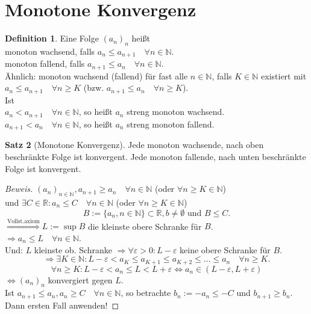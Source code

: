 \documentclass[12pt,a4paper,titlepage]{article} %
\theoremstyle{definition}
\newtheorem{satz}{Satz}[subsection]
\newtheorem{defi}[satz]{Definition}
\theoremstyle{remark}
\newenvironment{bew}{\begin{proof}[Beweis]}{\end{proof}}
\newcommand{\N}{\mathbb{N}}
\newcommand{\R}{\mathbb{R}}
\begin{document}
\section{Monotone Konvergenz}
\begin{defi}
	Eine Folge \((a_n)_n\) heißt \\monoton wachsend, falls \(a_n\leq a_{n+1} \quad \forall n\in\N \).\\monoton fallend, falls \(a_{n+1} \leq a_n \quad\forall n\in\N \).\\
	Ähnlich: monoton wachsend (fallend) für fast alle \(n\in\N\), falls \( K\in\N \) existiert mit \( a_n\leq a_{n+1} \quad \forall n\geq K \) (bzw. \(a_{n+1}\leq a_n \quad \forall n\geq K \)).\\
	Ist \\\( a_n<a_{n+1} \quad \forall n\in\N \), so heißt \(a_n\) streng monoton wachsend.\\
	\( a_{n+1}<a_n \quad \forall n\in\N \), so heißt \(a_n\) streng monoton fallend.
\end{defi}
\begin{satz}[Monotone Konvergenz]
	Jede monoton wachsende, nach oben beschränkte Folge ist konvergent. Jede monoton fallende, nach unten beschränkte Folge ist konvergent.
\end{satz}
\begin{bew}
	\((a_n)_{n\in\N}, a_{n+1} \geq a_n \quad \forall n\in\N \) (oder \( \forall n\geq K \in\N \))\\
	und \( \exists C\in\R: a_n \leq C \quad \forall n\in\N \) (oder \( \forall n\geq K \in\N \))\\
	\[ B:= \{a_n, n\in\N\} \subset \R, b\neq \emptyset \text{ und } B\leq C. \]
	\(\overset{\text{Vollst.axiom}}{\Rightarrow} L := \sup B\) die kleinste obere Schranke für \(B\).\\
	\(\Rightarrow a_n \leq L \quad \forall n\in\N \).\\
	Und: \(L\) kleinste ob. Schranke \( \Rightarrow \forall \varepsilon>0: L-\varepsilon \) keine obere Schranke für \(B\).\\
	\[ \Rightarrow \exists K \in\N: L-\varepsilon < a_K \leq a_{K+1} \leq a_{K+2} \leq \ldots \leq a_n \quad \forall n\geq K. \]
	\[ \forall n\geq K: L-\varepsilon < a_n \leq L < L + \varepsilon \Leftrightarrow a_n \in (L-\varepsilon, L + \varepsilon) \]
	\( \Leftrightarrow (a_n)_n \) konvergiert gegen \(L\).\\
	Ist \(a_{n+1} \leq a_n, a_n\geq C \quad \forall n\in\N \), so betrachte \(b_n := -a_n \leq -C \) und \(b_{n+1} \geq b_n\). Dann ersten Fall anwenden!
\end{bew}
\end{document}

